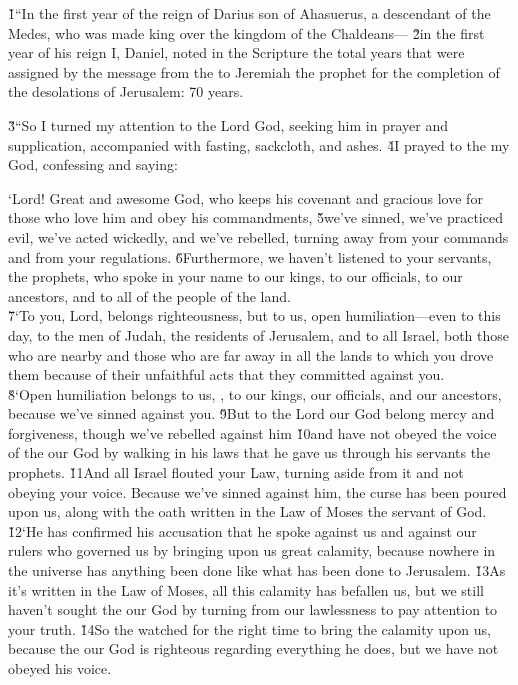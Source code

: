 \v{1}``In the first year of the reign of Darius son of Ahasuerus, a descendant of the Medes, who was made king over the kingdom of the Chaldeans--- \v{2}in the first year of his reign I, Daniel, noted in the Scripture the total years that were assigned by the message from the  to Jeremiah the prophet for the completion of the desolations of Jerusalem: 70 years.

\v{3}``So I turned my attention to the Lord God, seeking him in prayer and supplication, accompanied with fasting, sackcloth, and ashes. \v{4}I prayed to the  my God, confessing and saying:

\begin{poetry}
\poeml `Lord! Great and awesome God, who keeps his covenant and gracious love for those who love him and obey his commandments, \v{5}we've sinned, we've practiced evil, we've acted wickedly, and we've rebelled, turning away from your commands and from your regulations. \v{6}Furthermore, we haven't listened to your servants, the prophets, who spoke in your name to our kings, to our officials, to our ancestors, and to all of the people of the land. \\
\poeml \v{7}`To you, Lord, belongs righteousness, but to us, open humiliation---even to this day, to the men of Judah, the residents of Jerusalem, and to all Israel, both those who are nearby and those who are far away in all the lands to which you drove them because of their unfaithful acts that they committed against you. \\
\poeml \v{8}`Open humiliation belongs to us, , to our kings, our officials, and our ancestors, because we've sinned against you. \v{9}But to the Lord our God belong mercy and forgiveness, though we've rebelled against him \v{10}and have not obeyed the voice of the  our God by walking in his laws that he gave us through his servants the prophets. \v{11}And all Israel flouted your Law, turning aside from it and not obeying your voice. Because we've sinned against him, the curse has been poured upon us, along with the oath written in the Law of Moses the servant of God. \\
\poeml \v{12}`He has confirmed his accusation that he spoke against us and against our rulers who governed us by bringing upon us great calamity, because nowhere in the universe has anything been done like what has been done to Jerusalem. \v{13}As it's written in the Law of Moses, all this calamity has befallen us, but we still haven't sought the  our God by turning from our lawlessness to pay attention to your truth. \v{14}So the  watched for the right time to bring the calamity upon us, because the  our God is righteous regarding everything he does, but we have not obeyed his voice. \\

\end{poetry}

